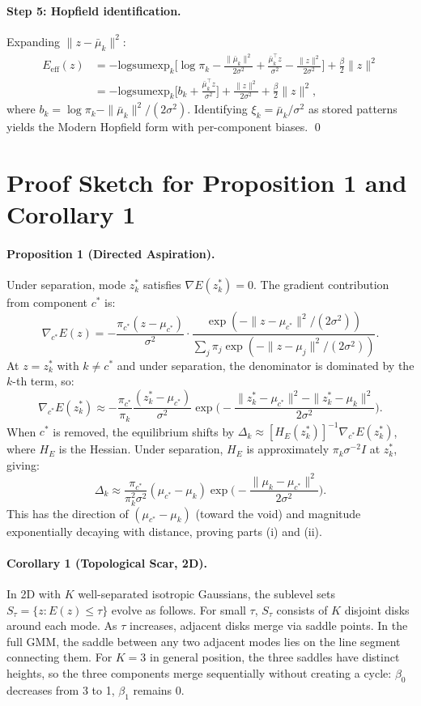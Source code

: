 \documentclass[11pt]{article}
\begin{document}
\paragraph{Step 5: Hopfield identification.}
Expanding $\|z - \bar{\mu}_k\|^2$:
\begin{align*}
E_{\text{eff}}(z) &=
  -\mathrm{logsumexp}_k\Big[
    \log\pi_k - \frac{\|\bar{\mu}_k\|^2}{2\sigma^2}
    + \frac{\bar{\mu}_k^\top z}{\sigma^2}
    - \frac{\|z\|^2}{2\sigma^2}
  \Big]
  + \frac{\beta}{2}\|z\|^2 \\
&= -\mathrm{logsumexp}_k\Big[
    b_k + \frac{\bar{\mu}_k^\top z}{\sigma^2}
  \Big]
  + \frac{\|z\|^2}{2\sigma^2} + \frac{\beta}{2}\|z\|^2,
\end{align*}
where $b_k = \log\pi_k - \|\bar{\mu}_k\|^2/(2\sigma^2)$.
Identifying $\xi_k = \bar{\mu}_k/\sigma^2$ as stored patterns yields the
Modern Hopfield form with per-component biases.
\qed


\section{Proof Sketch for Proposition 1 and Corollary 1}
\label{app:proofs}

\paragraph{Proposition 1 (Directed Aspiration).}
Under separation, mode $z_k^*$ satisfies $\nabla E(z_k^*) = 0$.
The gradient contribution from component $c^*$ is:
\[
\nabla_{c^*} E(z) =
  -\frac{\pi_{c^*}(z - \mu_{c^*})}{\sigma^2}
  \cdot \frac{\exp(-\|z-\mu_{c^*}\|^2/(2\sigma^2))}
             {\sum_j \pi_j \exp(-\|z-\mu_j\|^2/(2\sigma^2))}.
\]
At $z = z_k^*$ with $k \neq c^*$ and under separation, the denominator is
dominated by the $k$-th term, so:
\[
\nabla_{c^*} E(z_k^*) \approx
  -\frac{\pi_{c^*}}{\pi_k}\frac{(z_k^* - \mu_{c^*})}{\sigma^2}
  \exp\!\Big(-\frac{\|z_k^* - \mu_{c^*}\|^2 - \|z_k^* - \mu_k\|^2}{2\sigma^2}\Big).
\]
When $c^*$ is removed, the equilibrium shifts by
$\Delta_k \approx [H_E(z_k^*)]^{-1} \nabla_{c^*} E(z_k^*)$,
where $H_E$ is the Hessian.
Under separation, $H_E$ is approximately
$\pi_k \sigma^{-2} I$ at $z_k^*$, giving:
\[
\Delta_k \approx \frac{\pi_{c^*}}{\pi_k^2 \sigma^2}
  (\mu_{c^*} - \mu_k)
  \exp\!\Big(-\frac{\|\mu_k - \mu_{c^*}\|^2}{2\sigma^2}\Big).
\]
This has the direction of $(\mu_{c^*} - \mu_k)$ (toward the void) and
magnitude exponentially decaying with distance, proving parts (i) and (ii).

\paragraph{Corollary 1 (Topological Scar, 2D).}
In 2D with $K$ well-separated isotropic Gaussians, the sublevel sets
$S_\tau = \{z : E(z) \leq \tau\}$ evolve as follows.
For small $\tau$, $S_\tau$ consists of $K$ disjoint disks around each mode.
As $\tau$ increases, adjacent disks merge via saddle points.
In the full GMM, the saddle between any two adjacent modes lies on the
line segment connecting them.
For $K = 3$ in general position, the three saddles have distinct heights,
so the three components merge sequentially without creating a cycle:
$\beta_0$ decreases from 3 to 1, $\beta_1$ remains 0.
\end{document}
